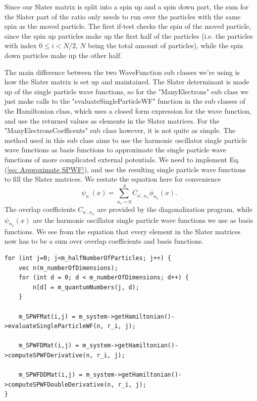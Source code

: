 \documentclass[../main.tex]{subfiles}
\begin{document}
Since our Slater matrix is split into a spin up and a spin down part, the sum for the Slater part of the ratio only needs to run over the particles with the same spin as the moved particle. The first if-test checks the spin of the moved particle, since the spin up particles make up the first half of the particles (i.e. the particles with index $0\leq i< N/2$, $N$ being the total amount of particles), while the spin down particles make up the other half.

The main difference between the two WaveFunction sub classes we're using is how the Slater matrix is set up and maintained. The Slater determinant is made up of the single particle wave functions, so for the "ManyElectrons" sub class we just make calls to the "evaluateSingleParticleWF" function in the sub classes of the Hamiltonian class, which uses a closed form expression for the wave function, and use the returned values as elements in the Slater matrices. For the "ManyElectronsCoefficents" sub class however, it is not quite as simple. The method used in this sub class aims to use the harmonic oscillator single particle wave functions as basis functions to approximate the single particle wave functions of more complicated external potentials. We need to implement Eq. (\ref{eq: Approximate SPWF}), and use the resulting single particle wave functions to fill the Slater matrices. We restate the equation here for convenience
\begin{equation}
    \psi_{n^\prime}(x) = \sum_{n_x=0}^{\Lambda} C_{n^\prime,n_x} \phi_{n_x}(x).
\end{equation}
The overlap coefficients $C_{n^\prime,n_x}$ are provided by the diagonalization program, while $\psi_{n_x}(x)$ are the harmonic oscillator single particle wave functions we use as basis functions. We see from the equation that every element in the Slater matrices now has to be a sum over overlap coefficients and basis functions. 

\lstset{language=c++}
\begin{lstlisting}[caption={Loop updating the Slater matrices when closed form expressions for the single particle wave functions are used. $i$ is the index of the particle that was moved in the current Metropolis step, while $r\_i$ is the position of that particle. For each changed element we only need to call functions which evaluate closed form expressions for the single particle wave function and its gradient and Laplacian.}]
for (int j=0; j<m_halfNumberOfParticles; j++) {
    vec n(m_numberOfDimensions);
    for (int d = 0; d < m_numberOfDimensions; d++) {
        n[d] = m_quantumNumbers(j, d);
    }

    m_SPWFMat(i,j) = m_system->getHamiltonian()->evaluateSingleParticleWF(n, r_i, j);

    m_SPWFDMat(i,j) = m_system->getHamiltonian()->computeSPWFDerivative(n, r_i, j);

    m_SPWFDDMat(i,j) = m_system->getHamiltonian()->computeSPWFDoubleDerivative(n, r_i, j);
}
\end{lstlisting}
\end{document}
